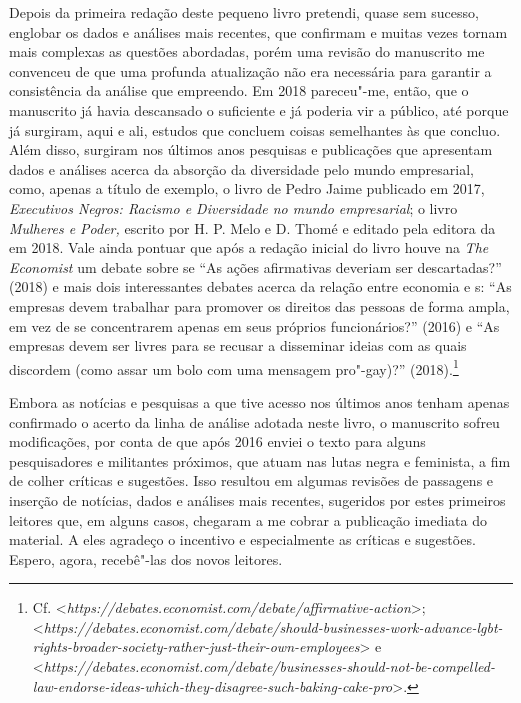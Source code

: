 Depois da primeira redação deste pequeno livro pretendi, quase sem
sucesso, englobar os dados e análises mais recentes, que confirmam e
muitas vezes tornam mais complexas as questões abordadas, porém uma
revisão do manuscrito me convenceu de que uma profunda atualização não
era necessária para garantir a consistência da análise que empreendo. Em
2018 pareceu"-me, então, que o manuscrito já havia descansado o
suficiente e já poderia vir a público, até porque já surgiram, aqui e
ali, estudos que concluem coisas semelhantes às que concluo. Além disso,
surgiram nos últimos anos pesquisas e publicações que apresentam dados e
análises acerca da absorção da diversidade pelo mundo empresarial, como,
apenas a título de exemplo, o livro de Pedro Jaime publicado em 2017,
\emph{Executivos Negros: Racismo e Diversidade no mundo empresarial}; o
livro \emph{Mulheres e Poder,} escrito por H. P. Melo e D. Thomé e
editado pela editora da  em 2018. Vale ainda pontuar que após a
redação inicial do livro houve na \emph{The Economist} um debate sobre
se ``As ações afirmativas deveriam ser descartadas?'' (2018) e mais dois
interessantes debates acerca da relação entre economia e s: ``As
empresas devem trabalhar para promover os direitos das pessoas  de
forma ampla, em vez de se concentrarem apenas em seus próprios
funcionários?'' (2016) e ``As empresas devem ser livres para se recusar
a disseminar ideias com as quais discordem (como assar um bolo com uma
mensagem pro"-gay)?'' (2018).\footnote{Cf.
  \textless{}\emph{https://debates.economist.com/debate/affirmative-action}\textgreater{};
  \textless{}\emph{https://debates.economist.com/debate/should-businesses-work-advance-lgbt-rights-broader-society-rather-just-their-own-employees}\textgreater{} e
  \textless{}\emph{https://debates.economist.com/debate/businesses-should-not-be-compelled-law-endorse-ideas-which-they-disagree-such-baking-cake-pro}\textgreater{}.}

Embora as notícias e pesquisas a que tive acesso nos últimos anos tenham
apenas confirmado o acerto da linha de análise adotada neste livro, o
manuscrito sofreu modificações, por conta de que após 2016 enviei o
texto para alguns pesquisadores e militantes próximos, que atuam nas
lutas negra e feminista, a fim de colher críticas e sugestões. Isso
resultou em algumas revisões de passagens e inserção de notícias, dados
e análises mais recentes, sugeridos por estes primeiros leitores que, em
alguns casos, chegaram a me cobrar a publicação imediata do material. A
eles agradeço o incentivo e especialmente as críticas e sugestões.
Espero, agora, recebê"-las dos novos leitores.


